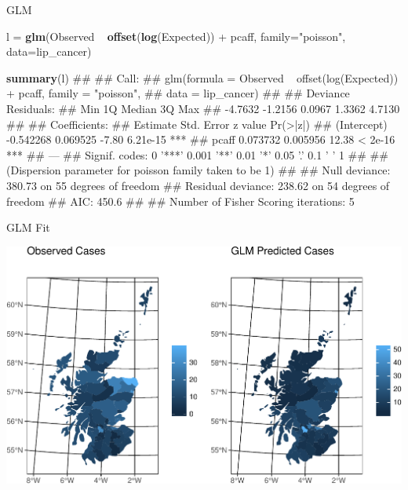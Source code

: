 \documentclass[11pt,ignorenonframetext,]{beamer}
\newenvironment{Shaded}{}{}
\newcommand{\DataTypeTok}[1]{\textcolor[rgb]{0.56,0.13,0.00}{#1}}
\newcommand{\KeywordTok}[1]{\textcolor[rgb]{0.00,0.44,0.13}{\textbf{#1}}}
\newcommand{\NormalTok}[1]{#1}
\newcommand{\OperatorTok}[1]{\textcolor[rgb]{0.40,0.40,0.40}{#1}}
\newcommand{\StringTok}[1]{\textcolor[rgb]{0.25,0.44,0.63}{#1}}
\let\oldShaded\Shaded
\let\endoldShaded\endShaded
\renewenvironment{Shaded}{\footnotesize\begin{spacing}{0.9}\oldShaded}{\endoldShaded\end{spacing}}
\let\oldverbatim\verbatim
\let\endoldverbatim\endverbatim
\newcommand{\scriptoutput}{
  \renewenvironment{Shaded}{\scriptsize\begin{spacing}{0.9}\oldShaded}{\endoldShaded\end{spacing}}
  \renewenvironment{verbatim}{\scriptsize\begin{spacing}{0.9}\oldverbatim}{\endoldverbatim\end{spacing}}
}
\begin{document}
\begin{frame}[fragile]{GLM}
\protect\hypertarget{glm}{}

\scriptoutput

\begin{Shaded}
\begin{Highlighting}[]
\NormalTok{l =}\StringTok{ }\KeywordTok{glm}\NormalTok{(Observed }\OperatorTok{~}\StringTok{ }\KeywordTok{offset}\NormalTok{(}\KeywordTok{log}\NormalTok{(Expected)) }\OperatorTok{+}\StringTok{ }\NormalTok{pcaff, }
        \DataTypeTok{family=}\StringTok{"poisson"}\NormalTok{, }\DataTypeTok{data=}\NormalTok{lip_cancer)}

\KeywordTok{summary}\NormalTok{(l)}
\NormalTok{## }
\NormalTok{## Call:}
\NormalTok{## glm(formula = Observed ~ offset(log(Expected)) + pcaff, family = "poisson", }
\NormalTok{##     data = lip_cancer)}
\NormalTok{## }
\NormalTok{## Deviance Residuals: }
\NormalTok{##     Min       1Q   Median       3Q      Max  }
\NormalTok{## -4.7632  -1.2156   0.0967   1.3362   4.7130  }
\NormalTok{## }
\NormalTok{## Coefficients:}
\NormalTok{##              Estimate Std. Error z value Pr(>|z|)    }
\NormalTok{## (Intercept) -0.542268   0.069525   -7.80 6.21e-15 ***}
\NormalTok{## pcaff        0.073732   0.005956   12.38  < 2e-16 ***}
\NormalTok{## ---}
\NormalTok{## Signif. codes:  0 '***' 0.001 '**' 0.01 '*' 0.05 '.' 0.1 ' ' 1}
\NormalTok{## }
\NormalTok{## (Dispersion parameter for poisson family taken to be 1)}
\NormalTok{## }
\NormalTok{##     Null deviance: 380.73  on 55  degrees of freedom}
\NormalTok{## Residual deviance: 238.62  on 54  degrees of freedom}
\NormalTok{## AIC: 450.6}
\NormalTok{## }
\NormalTok{## Number of Fisher Scoring iterations: 5}
\end{Highlighting}
\end{Shaded}

\end{frame}

\begin{frame}{GLM Fit}
\protect\hypertarget{glm-fit}{}

\begin{center}\includegraphics[width=\textwidth]{Lec19_files/figure-beamer/unnamed-chunk-6-1} \end{center}

\end{frame}
\end{document}
